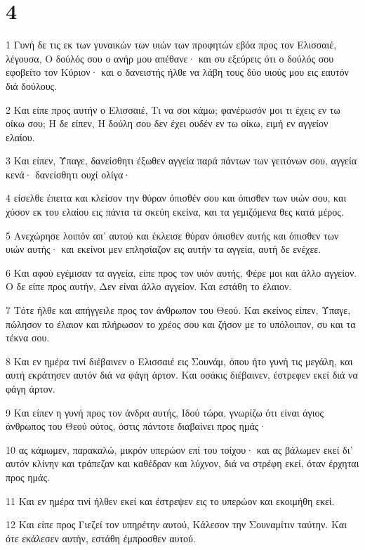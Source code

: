 \chapter{4}

\par 1 Γυνή δε τις εκ των γυναικών των υιών των προφητών εβόα προς τον Ελισσαιέ, λέγουσα, Ο δούλός σου ο ανήρ μου απέθανε· και συ εξεύρεις ότι ο δούλός σου εφοβείτο τον Κύριον· και ο δανειστής ήλθε να λάβη τους δύο υιούς μου εις εαυτόν διά δούλους.
\par 2 Και είπε προς αυτήν ο Ελισσαιέ, Τι να σοι κάμω; φανέρωσόν μοι τι έχεις εν τω οίκω σου; Η δε είπεν, Η δούλη σου δεν έχει ουδέν εν τω οίκω, ειμή εν αγγείον ελαίου.
\par 3 Και είπεν, Ύπαγε, δανείσθητι έξωθεν αγγεία παρά πάντων των γειτόνων σου, αγγεία κενά· δανείσθητι ουχί ολίγα·
\par 4 είσελθε έπειτα και κλείσον την θύραν όπισθέν σου και όπισθεν των υιών σου, και χύσον εκ του ελαίου εις πάντα τα σκεύη εκείνα, και τα γεμιζόμενα θες κατά μέρος.
\par 5 Ανεχώρησε λοιπόν απ' αυτού και έκλεισε θύραν όπισθεν αυτής και όπισθεν των υιών αυτής· και εκείνοι μεν επλησίαζον εις αυτήν τα αγγεία, αυτή δε ενέχεε.
\par 6 Και αφού εγέμισαν τα αγγεία, είπε προς τον υιόν αυτής, Φέρε μοι και άλλο αγγείον. Ο δε είπε προς αυτήν, Δεν είναι άλλο αγγείον. Και εστάθη το έλαιον.
\par 7 Τότε ήλθε και απήγγειλε προς τον άνθρωπον του Θεού. Και εκείνος είπεν, Ύπαγε, πώλησον το έλαιον και πλήρωσον το χρέος σου και ζήσον με το υπόλοιπον, συ και τα τέκνα σου.
\par 8 Και εν ημέρα τινί διέβαινεν ο Ελισσαιέ εις Σουνάμ, όπου ήτο γυνή τις μεγάλη, και αυτή εκράτησεν αυτόν διά να φάγη άρτον. Και οσάκις διέβαινεν, έστρεφεν εκεί διά να φάγη άρτον.
\par 9 Και είπεν η γυνή προς τον άνδρα αυτής, Ιδού τώρα, γνωρίζω ότι είναι άγιος άνθρωπος του Θεού ούτος, όστις πάντοτε διαβαίνει προς ημάς·
\par 10 ας κάμωμεν, παρακαλώ, μικρόν υπερώον επί του τοίχου· και ας βάλωμεν εκεί δι' αυτόν κλίνην και τράπεζαν και καθέδραν και λύχνον, διά να στρέφη εκεί, όταν έρχηται προς ημάς.
\par 11 Και εν ημέρα τινί ήλθεν εκεί και έστρεψεν εις το υπερώον και εκοιμήθη εκεί.
\par 12 Και είπε προς Γιεζεί τον υπηρέτην αυτού, Κάλεσον την Σουναμίτιν ταύτην. Και ότε εκάλεσεν αυτήν, εστάθη έμπροσθεν αυτού.
